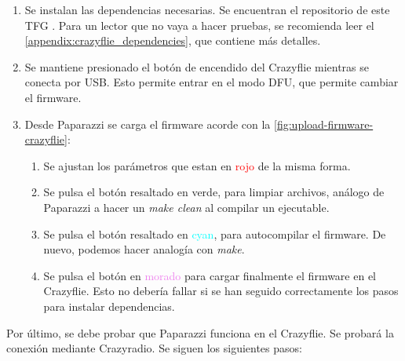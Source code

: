 \begin{enumerate}
    \item Se instalan las dependencias necesarias. Se encuentran el repositorio de este TFG \cite{bt-crazyflies}.
    Para un lector que no vaya a hacer pruebas, se recomienda leer el \autoref{appendix:crazyflie_dependencies}, que contiene más detalles.

    \item Se mantiene presionado el botón de encendido del Crazyflie mientras se conecta por USB.
    Esto permite entrar en el modo DFU, que permite cambiar el firmware.

    \item Desde Paparazzi se carga el firmware acorde con la \autoref{fig:upload-firmware-crazyflie}:

    \begin{enumerate}
        \item Se ajustan los parámetros que estan en \textcolor{red}{rojo} de la misma forma.
        
        \item Se pulsa el botón resaltado en \textcolor{Green3}{verde}, para limpiar archivos, análogo de Paparazzi a hacer un \textit{make clean} al compilar un ejecutable.
        
        \item Se pulsa el botón resaltado en \textcolor{cyan}{cyan}, para autocompilar el firmware. De nuevo, podemos hacer analogía con \textit{make}.

        \item Se pulsa el botón en \textcolor{violet}{morado} para cargar finalmente el firmware en el Crazyflie. Esto no debería fallar si se han seguido correctamente los pasos para instalar dependencias.
    \end{enumerate}
\end{enumerate}

Por último, se debe probar que Paparazzi funciona en el Crazyflie. 
Se probará la conexión mediante Crazyradio. Se siguen los siguientes pasos:

